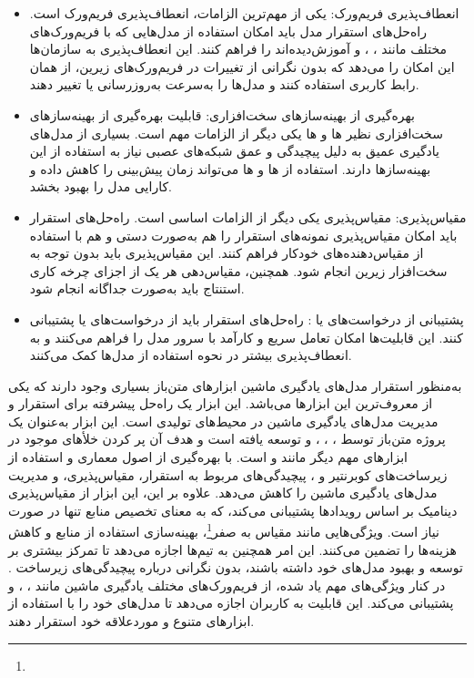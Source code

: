 \begin{itemize}
	\item 
	انعطاف‌پذیری فریم‌ورک:
	یکی از مهم‌ترین الزامات، انعطاف‌پذیری فریم‌ورک است. راه‌حل‌های استقرار مدل باید امکان استفاده از مدل‌هایی که با فریم‌ورک‌های مختلف مانند ، ، و  آموزش‌دیده‌اند را فراهم کنند. این انعطاف‌پذیری به سازمان‌ها این امکان را می‌دهد که بدون نگرانی از تغییرات در فریم‌ورک‌های زیرین، از همان رابط کاربری استفاده کنند و مدل‌ها را به‌سرعت به‌روزرسانی یا تغییر دهند.
	\item 
	بهره‌گیری از بهینه‌سازهای سخت‌افزاری:
	قابلیت بهره‌گیری از بهینه‌سازهای سخت‌افزاری نظیر ها و ها یکی دیگر از الزامات مهم است. بسیاری از مدل‌های یادگیری عمیق به دلیل پیچیدگی و عمق شبکه‌های عصبی نیاز به استفاده از این بهینه‌سازها دارند. استفاده از ها و ها می‌تواند زمان پیش‌بینی را کاهش داده و کارایی مدل را بهبود بخشد.
	\item
	مقیاس‌پذیری:
	مقیاس‌پذیری یکی دیگر از الزامات اساسی است. راه‌حل‌های استقرار باید امکان مقیاس‌پذیری نمونه‌های استقرار را هم به‌صورت دستی و هم با استفاده از مقیاس‌دهنده‌های خودکار فراهم کنند. این مقیاس‌پذیری باید بدون توجه به سخت‌افزار زیرین انجام شود. همچنین، مقیاس‌دهی هر یک از اجزای چرخه کاری استنتاج باید به‌صورت جداگانه انجام شود.
	\item 
	پشتیبانی از درخواست‌های  یا :
	راه‌حل‌های استقرار باید از درخواست‌های  یا  پشتیبانی کنند. این قابلیت‌ها امکان تعامل سریع و کارآمد با سرور مدل را فراهم می‌کنند و به انعطاف‌پذیری بیشتر در نحوه استفاده از مدل‌ها کمک می‌کنند. 
\end{itemize}

به‌منظور استقرار مدل‌های یادگیری ماشین ابزارهای متن‌باز بسیاری وجود دارند که یکی از معروف‌ترین این ابزارها  می‌باشد. این ابزار یک راه‌حل پیشرفته برای استقرار و مدیریت مدل‌های یادگیری ماشین در محیط‌های تولیدی است. این ابزار به‌عنوان یک پروژه متن‌باز توسط ، ، ، و  توسعه یافته است و هدف آن پر کردن خلأهای موجود در ابزارهای مهم دیگر مانند  و  است.  با بهره‌گیری از اصول معماری  و استفاده از زیرساخت‌های کوبرنتیر و ، پیچیدگی‌های مربوط به استقرار، مقیاس‌پذیری، و مدیریت مدل‌های یادگیری ماشین را کاهش می‌دهد. علاوه بر این، این ابزار از مقیاس‌پذیری دینامیک بر اساس رویدادها پشتیبانی می‌کند، که به معنای تخصیص منابع تنها در صورت نیاز است. ویژگی‌هایی مانند مقیاس به صفر\footnote{}، بهینه‌سازی استفاده از منابع و کاهش هزینه‌ها را تضمین می‌کنند. این امر همچنین به تیم‌ها اجازه می‌دهد تا تمرکز بیشتری بر توسعه و بهبود مدل‌های خود داشته باشند، بدون نگرانی درباره پیچیدگی‌های زیرساخت \cite{KServe}.
در کنار ویژگی‌های مهم یاد شده،  از فریم‌ورک‌های مختلف یادگیری ماشین مانند ، ، و  پشتیبانی می‌کند. این قابلیت به کاربران اجازه می‌دهد تا مدل‌های خود را با استفاده از ابزارهای متنوع و موردعلاقه خود استقرار دهند.

